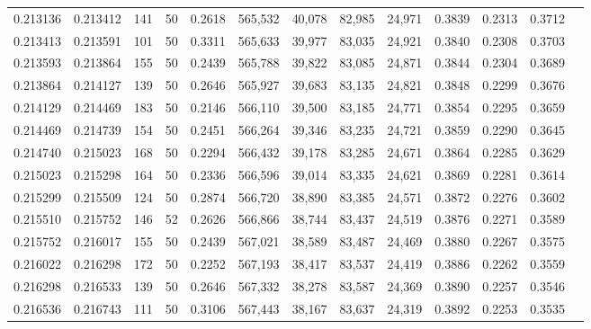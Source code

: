 \begin{tabular}{rrrrrrrrrrrrr}
0.213136 & 0.213412 &   141 &  50 &                                     0.2618 & 565,532 &  40,078 &  82,985 &  24,971 & 0.3839 & 0.2313 & 0.3712 \\
0.213413 & 0.213591 &   101 &  50 &                                     0.3311 & 565,633 &  39,977 &  83,035 &  24,921 & 0.3840 & 0.2308 & 0.3703 \\
0.213593 & 0.213864 &   155 &  50 &                                     0.2439 & 565,788 &  39,822 &  83,085 &  24,871 & 0.3844 & 0.2304 & 0.3689 \\
0.213864 & 0.214127 &   139 &  50 &                                     0.2646 & 565,927 &  39,683 &  83,135 &  24,821 & 0.3848 & 0.2299 & 0.3676 \\
0.214129 & 0.214469 &   183 &  50 &                                     0.2146 & 566,110 &  39,500 &  83,185 &  24,771 & 0.3854 & 0.2295 & 0.3659 \\
0.214469 & 0.214739 &   154 &  50 &                                     0.2451 & 566,264 &  39,346 &  83,235 &  24,721 & 0.3859 & 0.2290 & 0.3645 \\
0.214740 & 0.215023 &   168 &  50 &                                     0.2294 & 566,432 &  39,178 &  83,285 &  24,671 & 0.3864 & 0.2285 & 0.3629 \\
0.215023 & 0.215298 &   164 &  50 &                                     0.2336 & 566,596 &  39,014 &  83,335 &  24,621 & 0.3869 & 0.2281 & 0.3614 \\
0.215299 & 0.215509 &   124 &  50 &                                     0.2874 & 566,720 &  38,890 &  83,385 &  24,571 & 0.3872 & 0.2276 & 0.3602 \\
0.215510 & 0.215752 &   146 &  52 &                                     0.2626 & 566,866 &  38,744 &  83,437 &  24,519 & 0.3876 & 0.2271 & 0.3589 \\
0.215752 & 0.216017 &   155 &  50 &                                     0.2439 & 567,021 &  38,589 &  83,487 &  24,469 & 0.3880 & 0.2267 & 0.3575 \\
0.216022 & 0.216298 &   172 &  50 &                                     0.2252 & 567,193 &  38,417 &  83,537 &  24,419 & 0.3886 & 0.2262 & 0.3559 \\
0.216298 & 0.216533 &   139 &  50 &                                     0.2646 & 567,332 &  38,278 &  83,587 &  24,369 & 0.3890 & 0.2257 & 0.3546 \\
0.216536 & 0.216743 &   111 &  50 &                                     0.3106 & 567,443 &  38,167 &  83,637 &  24,319 & 0.3892 & 0.2253 & 0.3535 \\

\end{tabular}
